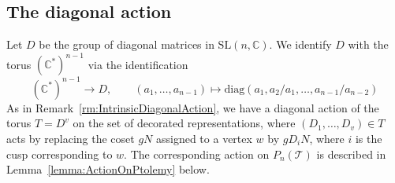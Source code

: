 \documentclass[12pt]{amsart}
\theoremstyle{definition}
\numberwithin{equation}{section}
\def\SL{\mathrm{SL}}
\def\diag{\text{diag}}
\def\C{\mathbb{C}}
\def\T{\mathcal{T}}
\begin{document}
\subsection{The diagonal action}
Let $D$ be the group of diagonal matrices in $\SL(n,\C)$. We identify $D$ with the torus $(\C^*)^{n-1}$ via the identification
\begin{equation}
(\C^*)^{n-1}\to D,\qquad (a_1,\dots,a_{n-1})\mapsto \diag(a_1,a_2/a_1,\dots,a_{n-1}/a_{n-2})
\end{equation}
As in Remark~\ref{rm:IntrinsicDiagonalAction}, we have a diagonal action of the torus $T=D^{v}$ on the set of decorated representations, where $(D_1,\dots,D_v)\in T$ acts by replacing the coset $gN$ assigned to a vertex $w$ by $gD_iN$, where $i$ is the cusp corresponding to $w$. The corresponding action on $P_n(\T)$ is described in Lemma~\ref{lemma:ActionOnPtolemy} below.
\end{document}

